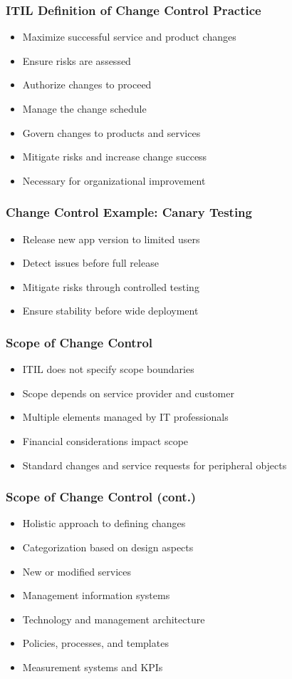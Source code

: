 \documentclass[aspectratio=169, table]{beamer}
\begin{document}
\begin{frame}
	\frametitle{ITIL Definition of Change Control Practice}
	\begin{itemize}
		\item Maximize successful service and product changes
		\item Ensure risks are assessed
		\item Authorize changes to proceed
		\item Manage the change schedule
		\item Govern changes to products and services
		\item Mitigate risks and increase change success
		\item Necessary for organizational improvement
	\end{itemize}
\end{frame}

\begin{frame}
	\frametitle{Change Control Example: Canary Testing}
	\begin{itemize}
		\item Release new app version to limited users
		\item Detect issues before full release
		\item Mitigate risks through controlled testing
		\item Ensure stability before wide deployment
	\end{itemize}
\end{frame}

\begin{frame}
	\frametitle{Scope of Change Control}
	\begin{itemize}
		\item ITIL does not specify scope boundaries
		\item Scope depends on service provider and customer
		\item Multiple elements managed by IT professionals
		\item Financial considerations impact scope
		\item Standard changes and service requests for peripheral objects
	\end{itemize}
\end{frame}

\begin{frame}
	\frametitle{Scope of Change Control (cont.)}
	\begin{itemize}
		\item Holistic approach to defining changes
		\item Categorization based on design aspects
		\item New or modified services
		\item Management information systems
		\item Technology and management architecture
		\item Policies, processes, and templates
		\item Measurement systems and KPIs
	\end{itemize}
\end{frame}
\end{document}
